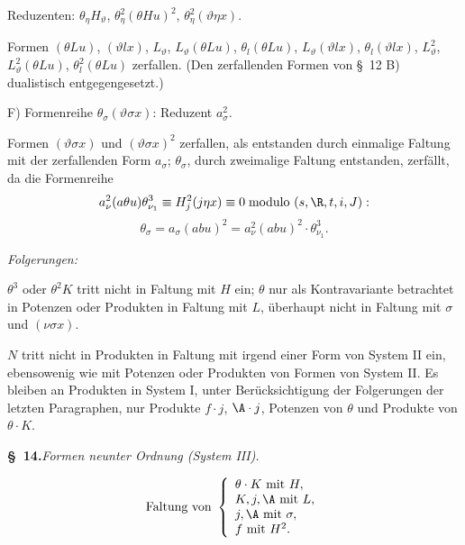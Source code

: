 Reduzenten: $\theta_\eta H_\vartheta$, $\theta_\eta^2(\theta Hu)^2$, $\theta_\eta^2(\vartheta\eta x)$.

Formen $(\theta Lu)$, $(\vartheta lx)$, $L_\vartheta$, $L_\vartheta(\theta Lu)$, $\theta_l(\theta Lu)$, $L_\vartheta(\vartheta lx)$, $\theta_l(\vartheta lx)$, $L_\vartheta^2$, $L_\vartheta^2(\theta Lu)$, $\theta_l^2(\theta Lu)$ zerfallen. (Den zerfallenden Formen von \S\ 12 B) dualistisch entgegengesetzt.)

\noindent F) Formenreihe $\theta_\sigma(\vartheta\sigma x)$: Reduzent $a_\sigma^2$.

Formen $(\vartheta\sigma x)$ und $(\vartheta\sigma x)^2$ zerfallen, als entstanden durch einmalige Faltung mit der zerfallenden Form $a_\sigma$; $\theta_\sigma$, durch zweimalige Faltung entstanden, zerfällt, da die Formenreihe
\[
a_\nu^2(a\theta u)\theta_{\nu_1}^3\equiv H_j^2(j\eta x)\equiv0\;\text{modulo }(s,\R,t,i,J):
\]
\[
\theta_\sigma=a_\sigma(abu)^2=a_\nu^2(abu)^2\cdot\theta_{\nu_1}^3.
\]

\noindent\emph{Folgerungen:}

$\theta^3$ oder $\theta^2K$ tritt nicht in Faltung mit $H$ ein; $\theta$ nur als Kontravariante betrachtet in Potenzen oder Produkten in Faltung mit $L$, überhaupt nicht in Faltung mit $\sigma$ und $(\nu\sigma x)$.

$N$ tritt nicht in Produkten in Faltung mit irgend einer Form von System II ein, ebensowenig wie mit Potenzen oder Produkten von Formen von System II. Es bleiben an Produkten in System I, unter Berücksichtigung der Folgerungen der letzten Paragraphen, nur Produkte $f\cdot j$, $\A\cdot j$, Potenzen von $\theta$ und Produkte von $\theta\cdot K$.

\begin{center}
\textbf{\S\ 14.}\quad\emph{Formen neunter Ordnung (System III).}
\end{center}
\[
\text{Faltung von }\left\{\begin{array}{l}
\theta\cdot K\text{ mit }H,\\
K,j,\A\text{ mit }L,\\
j,\A\text{ mit }\sigma,\\
f\text{ mit }H^2.
\end{array}\right.
\]


